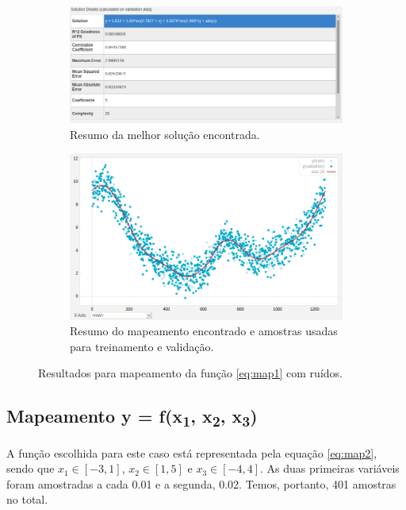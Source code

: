 \begin{figure}[h!]
		\begin{subfigure}{.5\textwidth}
		  \centering
		  \includegraphics[width=1\linewidth]{aproximacao/best_solucao_map1_r_info}
		  \caption{\centering Resumo da melhor solução encontrada.}
		  \label{fig:map1_best_c_ruido} 
		\end{subfigure} %
		\begin{subfigure}{.45\textwidth}
		  \centering
		  \includegraphics[width=1\linewidth]{aproximacao/solucoes_map1_r}
		  \caption{\centering Resumo do mapeamento encontrado e amostras usadas para
		  treinamento e validação.}
		  \label{fig:map1_c_ruido} 
		\end{subfigure}
	
	\caption{Resultados para mapeamento da função \ref{eq:map1} com ruídos.}
	\end{figure}
	
	\FloatBarrier

\subsection {Mapeamento y = f(x\textsubscript{1}, x\textsubscript{2},
x\textsubscript{3})}

A função escolhida para este caso está representada pela equação \ref{eq:map2},
sendo que \(x_1 \in [-3, 1]\), \(x_2 \in [1, 5]\) e \(x_3 \in [-4, 4]\). As duas
primeiras variáveis foram amostradas a cada 0.01 e a segunda, 0.02. Temos,
portanto, 401 amostras no total.

